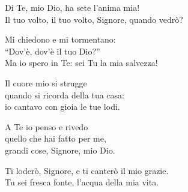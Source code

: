 

\spazio

\strofa Di Te, mio Dio, ha sete l'anima mia!\\
Il tuo volto, il tuo volto, Signore, quando vedrò? 

\spazio


\spazio

\strofa Mi chiedono e mi tormentano:\\
``Dov'è, dov'è il tuo Dio?''\\
Ma io spero in Te: sei Tu la mia salvezza! 

\spazio


\spazio

\strofa Il cuore mio si strugge\\
quando si ricorda della tua casa:\\
io cantavo con gioia le tue lodi. 

\spazio


\spazio

\strofa A Te io penso e rivedo\\
quello che hai fatto per me,\\
grandi cose, Signore, mio Dio. 

\spazio


\spazio

\strofa Ti loderò, Signore, e ti canterò il mio grazie.\\
Tu sei fresca fonte, l'acqua della mia vita. 

\spazio

